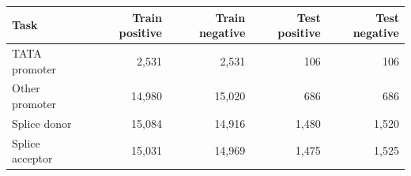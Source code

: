 \begin{tabular}{lrrrr}
\toprule
Task & Train positive & Train negative & Test positive & Test negative \\
\midrule
TATA promoter & 2,531 & 2,531 & 106 & 106 \\
Other promoter & 14,980 & 15,020 & 686 & 686 \\
Splice donor & 15,084 & 14,916 & 1,480 & 1,520 \\
Splice acceptor & 15,031 & 14,969 & 1,475 & 1,525 \\
\bottomrule
\end{tabular}
